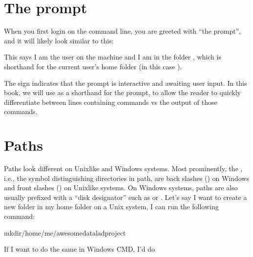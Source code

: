 \section{The prompt}
\label{\detokenize{intro/howto:the-prompt}}
\sphinxAtStartPar
When you first login on the command line, you are greeted with “the prompt”,
and it will likely look similar to this:

\sphinxAtStartPar
{}

\sphinxAtStartPar
This says I am the user  on the machine  and I am in the folder \sphinxcode{\sphinxupquote{\textasciitilde{}}},
which is shorthand for the current user’s home folder (in this case ).

\sphinxAtStartPar
The \sphinxcode{\sphinxupquote{\$}} sign indicates that the prompt is interactive and awaiting user input.
In this book, we will use \sphinxcode{\sphinxupquote{\$}} as a shorthand for the prompt, to allow
the reader to quickly differentiate between lines containing commands vs the
output of those commands.

\ignorespaces 

\section{Paths}
\label{\detokenize{intro/howto:paths}}\label{\detokenize{intro/howto:index-4}}
\sphinxAtStartPar
Paths look different on Unix\sphinxhyphen{}like and Windows systems.
Most prominently, the , i.e., the symbol distinguishing directories in path, are back slashes (\sphinxcode{\sphinxupquote{\textbackslash{}}}) on Windows and front slashes (\sphinxcode{\sphinxupquote{/}}) on Unix\sphinxhyphen{}like systems.
On Windows systems, paths are also usually prefixed with a “disk designator” such as  or .
Let’s say I want to create a new folder in my home folder on a Unix system,
I can run the following command:

\begin{sphinxVerbatim}[commandchars=\\\{\}]
mkdir/home/me/awesome\PYGZus{}datalad\PYGZus{}project
\end{sphinxVerbatim}

\sphinxAtStartPar
If I want to do the same in Windows CMD, I’d do

